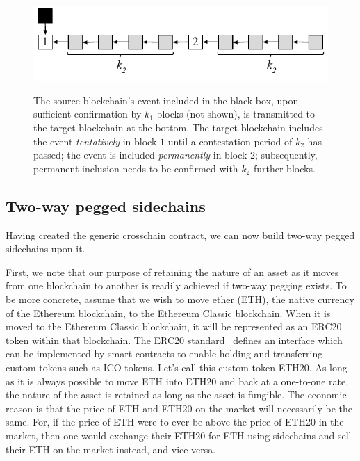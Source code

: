 \begin{figure}
    \caption{The source blockchain's event included in the black box, upon
             sufficient confirmation by $k_1$ blocks (not shown), is transmitted
             to the target blockchain at the bottom. The target blockchain
             includes the event \emph{tentatively} in block $1$ until a
             contestation period of $k_2$ has passed; the event is included
             \emph{permanently} in block $2$; subsequently, permanent inclusion
             needs to be confirmed with $k_2$ further blocks.}
    \centering
    \includegraphics[width=0.6 \columnwidth,keepaspectratio]{figures/contestation.pdf}
    \label{fig.contestation}
\end{figure}

\subsection*{Two-way pegged sidechains}
Having created the generic crosschain contract, we can now build two-way pegged
sidechains upon it.

First, we note that our purpose of retaining the nature of an asset as it moves
from one blockchain to another is readily achieved if two-way pegging exists. To
be more concrete, assume that we wish to move ether (ETH), the native currency
of the Ethereum blockchain, to the Ethereum Classic blockchain. When it is moved
to the Ethereum Classic blockchain, it will be represented as an ERC20 token
within that blockchain. The ERC20 standard~\cite{erc20} defines an interface
which can be implemented by smart contracts to enable holding and transferring
custom tokens such as ICO tokens. Let's call this custom token ETH20. As long as
it is always possible to move ETH into ETH20 and back at a one-to-one rate, the
nature of the asset is retained as long as the asset is fungible. The economic
reason is that the price of ETH and ETH20 on the market will necessarily be the
same. For, if the price of ETH were to ever be above the price of ETH20 in the
market, then one would exchange their ETH20 for ETH using sidechains and sell
their ETH on the market instead, and vice versa.


